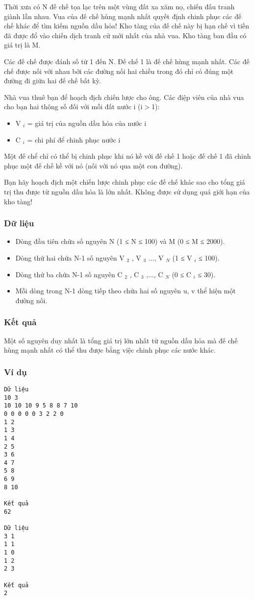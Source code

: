 

Thời xưa có N đế chế tọa lạc trên một vùng đất xa xăm nọ, chiến đấu tranh giành lẫn nhau. Vua của đế chế hùng mạnh nhất quyết định chinh phục các đế chế khác để tìm kiếm nguồn dầu hỏa! Kho tàng của đế chế này bị hạn chế vì tiền đã được đổ vào chiến dịch tranh cử mới nhất của nhà vua. Kho tàng ban đầu có giá trị là M.

Các đế chế được đánh số từ 1 đến N. Đế chế 1 là đế chế hùng mạnh nhất. Các đế chế được nối với nhau bởi các đường nối hai chiều trong đó chỉ có đúng một đường đi giữa hai đế chế bất kỳ.

Nhà vua thuê bạn để hoạch địch chiến lược cho ông. Các điệp viên của nhà vua cho bạn hai thông số đối với mỗi đất nước i (i$>$1):
\begin{itemize}
	\item V $_ i $ = giá trị của nguồn dầu hỏa của nước i
	\item C $_ i $ = chi phí để chinh phục nước i
\end{itemize}

Một đế chể chỉ có thể bị chinh phục khi nó kề với đế chế 1 hoặc đế chế 1 đã chinh phục một đế chế kề với nó (nối với nó qua một con đường).

Bạn hãy hoạch địch một chiến lược chinh phục các đế chế khác sao cho tổng giá trị thu được từ nguồn dầu hỏa là lớn nhất. Không được sử dụng quá giới hạn của kho tàng!

\subsubsection{Dữ liệu}
\begin{itemize}
	\item Dòng đầu tiên chứa số nguyên N (1 ≤ N ≤ 100) và M (0 ≤ M ≤ 2000).
	\item Dòng thứ hai chứa N-1 số nguyên V $_ 2 $ , V $_ 3 $ ..., V $_ N $ (1 ≤ V $_ i $ ≤ 100).
	\item Dòng thứ ba chứa N-1 số nguyên C $_ 2 $ , C $_ 3 $ ,..., C $_ N $ (0 ≤ C $_ i $ ≤ 30).
	\item Mỗi dòng trong N-1 dòng tiếp theo chứa hai số nguyên u, v thể hiện một đường nối.
\end{itemize}

\subsubsection{Kết quả}

Một số nguyên duy nhất là tổng giá trị lớn nhất từ nguồn dầu hỏa mà đế chế hùng mạnh nhất có thể thu được bằng việc chinh phục các nước khác.

\subsubsection{Ví dụ}
\begin{verbatim}
Dữ liệu
10 3
10 10 10 9 5 8 8 7 10
0 0 0 0 0 3 2 2 0
1 2
1 3
1 4
2 5
3 6
4 7
5 8
6 9
8 10

Kết quả
62

Dữ liệu
3 1
1 1
1 0
1 2
2 3

Kết quả
2
\end{verbatim}